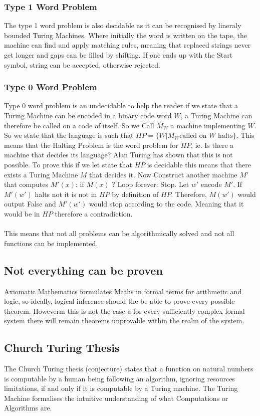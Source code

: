 \subsubsection{Type 1 Word Problem}
The type 1 word problem is also decidable as it can be recognised by lineraly bounded Turing Machines. Where initially the word is written on the tape, the machine can find and apply matching rules, meaning that replaced strings never get longer and gaps can be filled by shifting. If one ends up with the Start symbol, string can be accepted, otherwise rejected.
\subsubsection{Type 0 Word Problem}
Type 0 word problem is an undecidable to help the reader if 
we state that a Turing Machine can be encoded in a binary code word $W$, a Turing Machine can therefore be called on a code of itself. So we Call $M_W$ a machine implementing $W$. So we state that the language is such that $HP = \{W|M_W \text{called on $W$ halts} \}$. This means that the Halting Problem is the word problem for $HP$, ie. Is there a machine that decides its language? Alan Turing has shown that this is not possible.
To prove this if we let state that $HP$ is decidable this means that there exists a Turing Machine $M$ that decides it. Now Construct another machine $M\prime$ that computes $M\prime(x)$: if $M(x)$ ? Loop forever: Stop. Let $w\prime$ encode $M\prime$. If $M\prime(w\prime)$ halts not it is not in $HP$ by definition of $HP$. Therefore, $M(w\prime)$ would output False and $M\prime(w\prime)$ would stop according to the code. Meaning that it would be in $HP$ therefore a contradiction. 
\\\\
This means that not all problems can be algorithmically solved and not all functions can be implemented.
\subsection{Not everything can be proven} 
Axiomatic Mathematics formulates Maths in formal terms for arithmetic and logic, so ideally, logical inference should the be able to prove every possible theorem. Howeverm this is not the case a for every sufficiently complex formal system there will remain theorems unprovable within the realm of the system.
\subsection{Church Turing Thesis}
The Church Turing thesis (conjecture) states that a function on natural numbers is computable by a human being following an algorithm, ignoring resources limitations, if and only if it is computable by a Turing machine. The Turing Machine formalises the intuitive understanding of what Computations or Algorithms are. 
